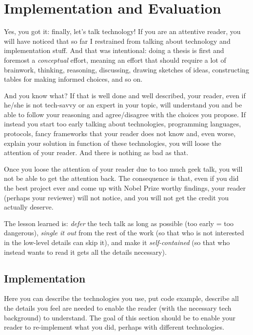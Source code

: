 \chapter{Implementation and Evaluation}
\label{capitolo7}
\thispagestyle{empty}

Yes, you got it: finally, let's talk technology! If you are an attentive reader, you will have noticed that so far I restrained from talking about technology and implementation stuff. And that was intentional: doing a thesis is first and foremost a \emph{conceptual} effort, meaning an effort that should require a lot of brainwork, thinking, reasoning, discussing, drawing sketches of ideas, constructing tables for making informed choices, and so on. 

And you know what? If that is well done and well described, your reader, even if he/she is not tech-savvy or an expert in your topic, will understand you and be able to follow your reasoning and agree/disagree with the choices you propose. If instead you start too early talking about technologies, programming languages, protocols, fancy frameworks that your reader does not know and, even worse, explain your solution in function of these technologies, you will loose the attention of your reader. And there is nothing as bad as that. 

Once you loose the attention of your reader due to too much geek talk, you will not be able to get the attention back. The consequence is that, even if you did the best project ever and come up with Nobel Prize worthy findings, your reader (perhaps your reviewer) will not notice, and you will not get the credit you actually deserve. 

The lesson learned is: \emph{defer} the tech talk as long as possible (too early = too dangerous), \emph{single it out} from the rest of the work (so that who is not interested in the low-level details can skip it), and make it \emph{self-contained} (so that who instead wants to read it gets all the details necessary).


\section{Implementation}
Here you can describe the technologies you use, put code example, describe all the details you feel are needed to enable the reader (with the necessary tech background) to understand. The goal of this section should be to enable your reader to re-implement what you did, perhaps with different technologies. 

